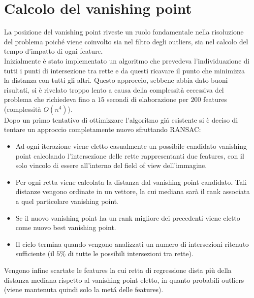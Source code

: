 \documentclass[12pt]{report}
\begin{document}
\section{Calcolo del vanishing point}
La posizione del vanishing point riveste un ruolo fondamentale nella risoluzione del problema poich\'e viene coinvolto sia nel filtro degli outliers, sia nel calcolo del tempo d'impatto di ogni feature.\\

\noindent Inizialmente \`e stato implementato un algoritmo che prevedeva l'individuazione di tutti i punti di intersezione tra rette e da questi ricavare il punto che minimizza la distanza con tutti gli altri. Questo approccio, sebbene abbia dato buoni risultati, si \`e rivelato troppo lento a causa della complessit\`a eccessiva del problema che richiedeva fino a $15$ secondi di elaborazione per $200$ features (complessit\`a $O\left(n^4\right)$).\\

\noindent Dopo un primo tentativo di ottimizzare l'algoritmo gi\'a esistente si \`e deciso di tentare un approccio completamente nuovo sfruttando RANSAC:

\begin{itemize}
\item	Ad ogni iterazione viene eletto casualmente un possibile candidato vanishing point calcolando l'intersezione delle rette rappresentanti due features, con il solo vincolo di essere all'interno del field of view dell'immagine.
\item	Per ogni retta viene calcolata la distanza dal vanishing point candidato. Tali distanze vengono ordinate in un vettore, la cui mediana sar\`a il rank associata a quel particolare vanishing point.
\item	Se il nuovo vanishing point ha un rank migliore dei precedenti viene eletto come nuovo best vanishing point.
\item	Il ciclo termina quando vengono analizzati un numero di intersezioni ritenuto sufficiente (il $5\%$ di tutte le possibili intersezioni tra rette).
\end{itemize}

\noindent Vengono infine scartate le features la cui retta di regressione dista pi\`u della distanza mediana rispetto al vanishing point eletto, in quanto probabili outliers (viene mantenuta quindi solo la met\'a delle features).
\end{document}
